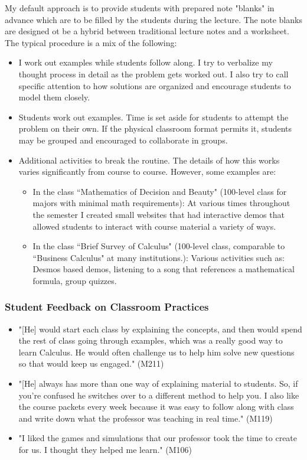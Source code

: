 \documentclass{article}
\begin{document}
My default approach is to provide students with prepared note "blanks" in advance which are to be filled by the students during the lecture. 
The note blanks are designed ot be a hybrid between traditional lecture notes and a worksheet.
The typical procedure is a mix of the following:
\begin{itemize}
\item I work out examples while students follow along. I try to verbalize my thought process in detail as the problem gets worked out. 
I also try to call specific attention to how solutions are organized and encourage students to model them closely.
\item Students work out examples. Time is set aside for students to attempt the problem on their own. If the physical classroom format permits it, students may be grouped and encouraged to collaborate in groups.
\item Additional activities to break the routine. The details of how this works varies significantly from course to course. However, some examples are:
\begin{itemize}
\item In the class ``Mathematics of Decision and Beauty" (100-level class for majors with minimal math requirements): At various times throughout the semester I created small websites that had interactive demos that allowed students to interact with course material a variety of ways.
\item In the class ``Brief Survey of Calculus" (100-level class, comparable to ``Business Calculus" at many institutions.): Various activities such as: Desmos based demos, listening to a song that references a mathematical formula, group quizzes.
\end{itemize}
\end{itemize}
\subsubsection*{Student Feedback on Classroom Practices}
\begin{itemize}
\item "[He] would start each class by explaining the concepts, and then would spend the rest of class going through examples, which was a really good way to learn Calculus. He would often challenge us to help him solve new questions so that would keep us engaged." (M211)
\item "[He] always has more than one way of explaining material to students. So, if you're confused he switches over to a different method to help you. I also like the course packets every week because it was easy to follow along with class and write down what the professor was teaching in real time." (M119)
\item "I liked the games and simulations that our professor took the time to create for us. I thought they helped me learn." (M106)
\end{itemize}
\end{document}
